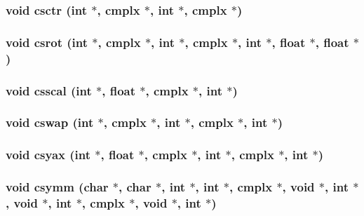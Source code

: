 \subsubsection{\setlength{\rightskip}{0pt plus 5cm}void csctr (int $\ast$, {\bf cmplx} $\ast$, int $\ast$, {\bf cmplx} $\ast$)}\label{essl_8h_7adf4959e2a84d94c8ecaf3b3a0bc19f}


\subsubsection{\setlength{\rightskip}{0pt plus 5cm}void csrot (int $\ast$, {\bf cmplx} $\ast$, int $\ast$, {\bf cmplx} $\ast$, int $\ast$, float $\ast$, float $\ast$)}\label{essl_8h_a73994e0b3cce19d08f14dcde46785b0}


\subsubsection{\setlength{\rightskip}{0pt plus 5cm}void csscal (int $\ast$, float $\ast$, {\bf cmplx} $\ast$, int $\ast$)}\label{essl_8h_3a8fd1cd78e683dca04f037aba3d8159}


\subsubsection{\setlength{\rightskip}{0pt plus 5cm}void cswap (int $\ast$, {\bf cmplx} $\ast$, int $\ast$, {\bf cmplx} $\ast$, int $\ast$)}\label{essl_8h_7416eb5dac4c8c88e1f4126fffb2b346}


\subsubsection{\setlength{\rightskip}{0pt plus 5cm}void csyax (int $\ast$, float $\ast$, {\bf cmplx} $\ast$, int $\ast$, {\bf cmplx} $\ast$, int $\ast$)}\label{essl_8h_74c024ffbce5b2462902bb253000dfa7}


\subsubsection{\setlength{\rightskip}{0pt plus 5cm}void csymm (char $\ast$, char $\ast$, int $\ast$, int $\ast$, {\bf cmplx} $\ast$, void $\ast$, int $\ast$, void $\ast$, int $\ast$, {\bf cmplx} $\ast$, void $\ast$, int $\ast$)}\label{essl_8h_fda1125a1d0e7d41e74766ab710b87af}


